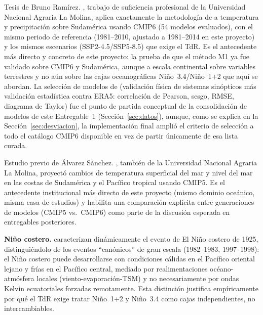 \documentclass[11pt,a4paper]{article}
\begin{document}
Tesis de Bruno Ram\'irez. \citet{bruno2023}, trabajo de suficiencia profesional de la Universidad Nacional Agraria La Molina, aplica exactamente la metodolog\'ia de \citet{szabo2016} a temperatura y precipitaci\'on sobre Sudam\'erica usando CMIP6 (54 modelos evaluados), con el mismo periodo de referencia (1981--2010, ajustado a 1981--2014 en este proyecto) y los mismos escenarios (SSP2-4.5/SSP5-8.5) que exige el TdR. Es el antecedente m\'as directo y concreto de este proyecto: la prueba de que el m\'etodo M1 ya fue validado sobre CMIP6 y Sudam\'erica, aunque a escala continental sobre variables terrestres y no a\'un sobre las cajas oceanogr\'aficas Ni\~no~3.4/Ni\~no~1+2 que aqu\'i se abordan. La selecci\'on de modelos de \citet{bruno2023} (validaci\'on f\'isica de sistemas sin\'opticos m\'as validaci\'on estad\'istica contra ERA5: correlaci\'on de Pearson, sesgo, RMSE, diagrama de Taylor) fue el punto de partida conceptual de la consolidaci\'on de modelos de este Entregable~1 (Secci\'on~\ref{sec:datos}), aunque, como se explica en la Secci\'on~\ref{sec:desviacion}, la implementaci\'on final ampli\'o el criterio de selecci\'on a todo el cat\'alogo CMIP6 disponible en vez de partir \'unicamente de esa lista curada.

Estudio previo de \'Alvarez S\'anchez. \citet{alvarez2024}, tambi\'en de la Universidad Nacional Agraria La Molina, proyect\'o cambios de temperatura superficial del mar y nivel del mar en las costas de Sudam\'erica y el Pac\'ifico tropical usando CMIP5. Es el antecedente institucional m\'as directo de este proyecto (mismo dominio oce\'anico, misma casa de estudios) y habilita una comparaci\'on expl\'icita entre generaciones de modelos (CMIP5 vs.\ CMIP6) como parte de la discusi\'on esperada en entregables posteriores.

\textbf{Ni\~no costero.} \citet{takahashi2019} caracterizan din\'amicamente el evento de El Ni\~no costero de 1925, distingui\'endolo de los eventos ``can\'onicos'' de gran escala (1982--1983, 1997--1998): el Ni\~no costero puede desarrollarse con condiciones c\'alidas en el Pac\'ifico oriental lejano y fr\'ias en el Pac\'ifico central, mediado por realimentaciones oc\'eano-atm\'osfera locales (viento-evaporaci\'on-TSM) y no necesariamente por ondas Kelvin ecuatoriales forzadas remotamente. Esta distinci\'on justifica emp\'iricamente por qu\'e el TdR exige tratar Ni\~no~1+2 y Ni\~no~3.4 como cajas independientes, no intercambiables.
\end{document}
